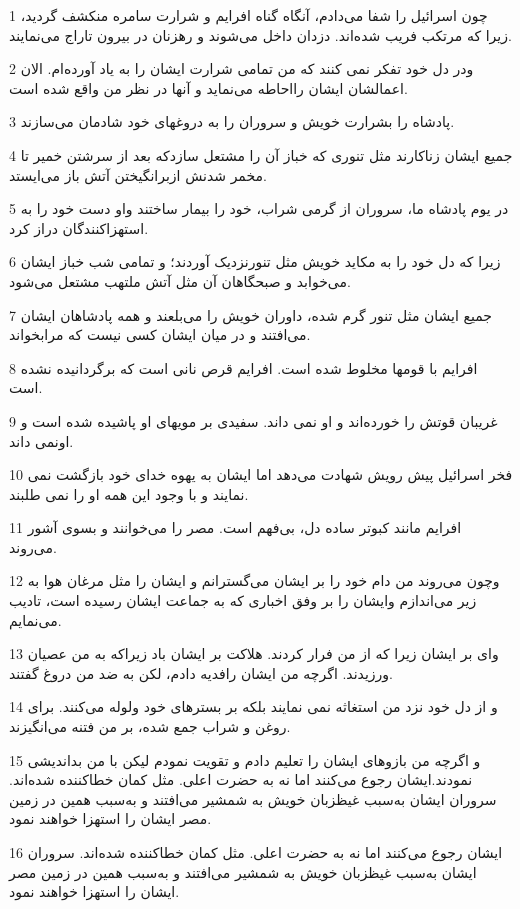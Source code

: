 \par 1 چون اسرائیل را شفا می‌دادم، آنگاه گناه افرایم و شرارت سامره منکشف گردید، زیرا که مرتکب فریب شده‌اند. دزدان داخل می‌شوند و رهزنان در بیرون تاراج می‌نمایند.
\par 2 ودر دل خود تفکر نمی کنند که من تمامی شرارت ایشان را به یاد آورده‌ام. الان اعمالشان ایشان رااحاطه می‌نماید و آنها در نظر من واقع شده است.
\par 3 پادشاه را بشرارت خویش و سروران را به دروغهای خود شادمان می‌سازند.
\par 4 جمیع ایشان زناکارند مثل تنوری که خباز آن را مشتعل سازدکه بعد از سرشتن خمیر تا مخمر شدنش ازبرانگیختن آتش باز می‌ایستد.
\par 5 در یوم پادشاه ما، سروران از گرمی شراب، خود را بیمار ساختند واو دست خود را به استهزاکنندگان دراز کرد.
\par 6 زیرا که دل خود را به مکاید خویش مثل تنورنزدیک آوردند؛ و تمامی شب خباز ایشان می‌خوابد و صبحگاهان آن مثل آتش ملتهب مشتعل می‌شود.
\par 7 جمیع ایشان مثل تنور گرم شده، داوران خویش را می‌بلعند و همه پادشاهان ایشان می‌افتند و در میان ایشان کسی نیست که مرابخواند.
\par 8 افرایم با قومها مخلوط شده است. افرایم قرص نانی است که برگردانیده نشده است.
\par 9 غریبان قوتش را خورده‌اند و او نمی داند. سفیدی بر مویهای او پاشیده شده است و اونمی داند.
\par 10 فخر اسرائیل پیش رویش شهادت می‌دهد اما ایشان به یهوه خدای خود بازگشت نمی نمایند و با وجود این همه او را نمی طلبند.
\par 11 افرایم مانند کبوتر ساده دل، بی‌فهم است. مصر را می‌خوانند و بسوی آشور می‌روند.
\par 12 وچون می‌روند من دام خود را بر ایشان می‌گسترانم و ایشان را مثل مرغان هوا به زیر می‌اندازم وایشان را بر وفق اخباری که به جماعت ایشان رسیده است، تادیب می‌نمایم.
\par 13 وای بر ایشان زیرا که از من فرار کردند. هلاکت بر ایشان باد زیراکه به من عصیان ورزیدند. اگر‌چه من ایشان رافدیه دادم، لکن به ضد من دروغ گفتند.
\par 14 و از دل خود نزد من استغاثه نمی نمایند بلکه بر بسترهای خود ولوله می‌کنند. برای روغن و شراب جمع شده، بر من فتنه می‌انگیزند.
\par 15 و اگر‌چه من بازوهای ایشان را تعلیم دادم و تقویت نمودم لیکن با من بداندیشی نمودند.ایشان رجوع می‌کنند اما نه به حضرت اعلی. مثل کمان خطاکننده شده‌اند. سروران ایشان به‌سبب غیظزبان خویش به شمشیر می‌افتند و به‌سبب همین در زمین مصر ایشان را استهزا خواهند نمود.
\par 16 ایشان رجوع می‌کنند اما نه به حضرت اعلی. مثل کمان خطاکننده شده‌اند. سروران ایشان به‌سبب غیظزبان خویش به شمشیر می‌افتند و به‌سبب همین در زمین مصر ایشان را استهزا خواهند نمود.

